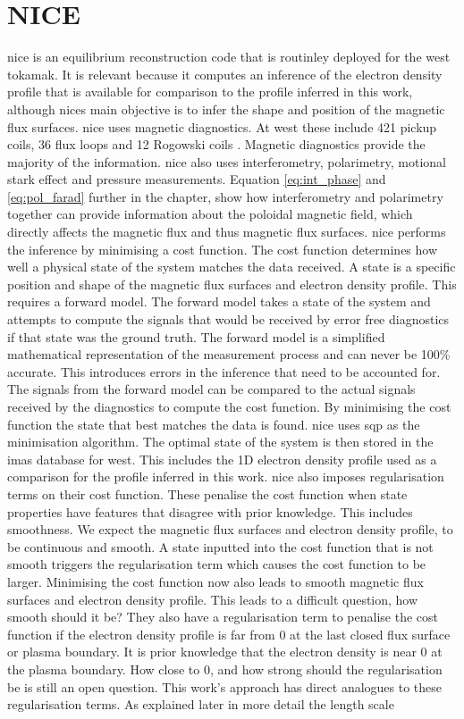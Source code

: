 \section{NICE}

\gls{nice} is an equilibrium reconstruction code that is routinley deployed for the \gls{west} tokamak. It is relevant because it computes an inference of the electron density profile that is available for comparison to the profile inferred in this work, although \glspl{nice} main objective is to infer the shape and position of the magnetic flux surfaces. \gls{nice} uses magnetic diagnostics. At \gls{west} these include 421 pickup coils, 36 flux loops and 12 Rogowski coils \cite{westmagdiag}. Magnetic diagnostics provide the majority of the information. \gls{nice} also uses interferometry, polarimetry, motional stark effect and pressure measurements. Equation \ref{eq:int_phase} and \ref{eq:pol_farad} further in the chapter, show how interferometry and polarimetry together can provide information about the poloidal magnetic field, which directly affects the magnetic flux and thus magnetic flux surfaces. \gls{nice} performs the inference by minimising a cost function. The cost function determines how well a physical state of the system matches the data received. A state is a specific position and shape of the magnetic flux surfaces and electron density profile. This requires a forward model. The forward model takes a state of the system and attempts to compute the signals that would be received by error free diagnostics if that state was the ground truth. The forward model is a simplified mathematical representation of the measurement process and can never be 100\% accurate. This introduces errors in the inference that need to be accounted for. The signals from the forward model can be compared to the actual signals received by the diagnostics to compute the cost function. By minimising the cost function the state that best matches the data is found. \gls{nice} uses \gls{sqp} as the minimisation algorithm. The optimal state of the system is then stored in the \gls{imas} database for \gls{west}. This includes the 1D electron density profile used as a comparison for the profile inferred in this work. \gls{nice} also imposes regularisation terms on their cost function. These penalise the cost function when state properties have features that disagree with prior knowledge. This includes smoothness. We expect the magnetic flux surfaces and electron density profile, to be continuous and smooth. A state inputted into the cost function that is not smooth triggers the regularisation term which causes the cost function to be larger. Minimising the cost function now also leads to smooth magnetic flux surfaces and electron density profile. This leads to a difficult question, how smooth should it be? They also have a regularisation term to penalise the cost function if the electron density profile is far from 0 at the last closed flux surface or plasma boundary. It is prior knowledge that the electron density is near 0 at the plasma boundary. How close to 0, and how strong should the regularisation be is still an open question. This work's approach has direct analogues to these regularisation terms. As explained later in more detail the length scale 